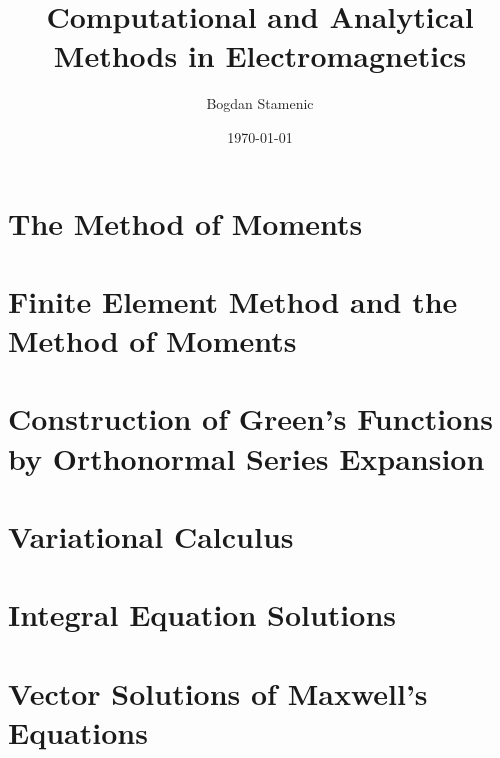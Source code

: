 

\newcommand{\FormelsammlungTitel}{Computational and Analytical Methods in Electromagnetics}
\newcommand{\FormelsammlungAutor}{Bogdan Stamenic}
\setcounter{tocdepth}{2} %


	\title{\FormelsammlungTitel}
	\author{\FormelsammlungAutor}
	\date{\today}
	\begin{multicols*}{3}
			\maketitle
			\tableofcontents
		
		
		\section{The Method of Moments}
        \lipsum[3]
		\section{Finite Element Method and the Method of Moments}
        \lipsum[4]
		\section{Construction of Green's Functions by Orthonormal Series Expansion}
        \lipsum[5]
		\section{Variational Calculus}
        \lipsum[6]
		\section{Integral Equation Solutions}
        \lipsum[7]
		\section{Vector Solutions of Maxwell's Equations}
        \lipsum[8]
	\end{multicols*}

